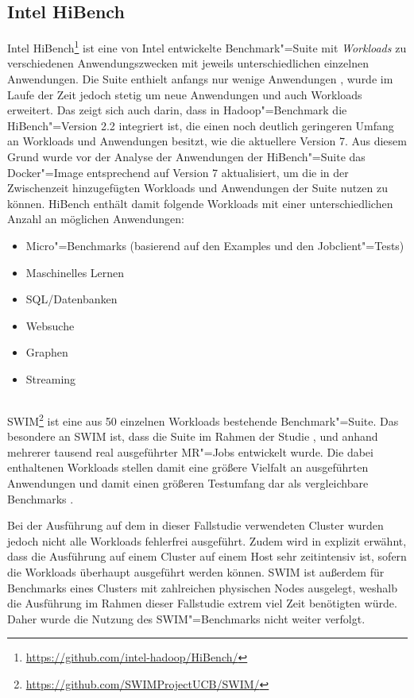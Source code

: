 \subsection{Intel HiBench}
\label{subsec:hibench}

Intel HiBench\footnote{\url{https://github.com/intel-hadoop/HiBench/}} ist eine von Intel entwickelte Benchmark"=Suite mit \emph{Workloads} zu verschiedenen Anwendungszwecken mit jeweils unterschiedlichen einzelnen Anwendungen.
Die Suite enthielt anfangs nur wenige Anwendungen \cite{Huang2010}, wurde im Laufe der Zeit jedoch stetig um neue Anwendungen und auch Workloads erweitert.
Das zeigt sich auch darin, dass in Hadoop"=Benchmark die HiBench"=Version \mbox{2.2} integriert ist, die einen noch deutlich geringeren Umfang an Workloads und Anwendungen besitzt, wie \zB die aktuellere Version 7.
Aus diesem Grund wurde vor der Analyse der Anwendungen der HiBench"=Suite das Docker"=Image entsprechend auf Version 7 aktualisiert, um die in der Zwischenzeit hinzugefügten Workloads und Anwendungen der Suite nutzen zu können.
HiBench enthält damit folgende Workloads mit einer unterschiedlichen Anzahl an möglichen Anwendungen:

\begin{itemize}
    \item Micro"=Benchmarks (basierend auf den Examples und den Jobclient"=Tests)
    \item Maschinelles Lernen
    \item SQL/Datenbanken
    \item Websuche
    \item Graphen
    \item Streaming
\end{itemize}

\subsection{}
\label{subsec:swim}

\gls{SWIM}\footnote{\url{https://github.com/SWIMProjectUCB/SWIM/}} ist eine aus 50 einzelnen Workloads bestehende Benchmark"=Suite.
Das besondere an \gls{SWIM} ist, dass die Suite im Rahmen der Studie \cite{Chen2012}, und anhand mehrerer tausend real ausgeführter \gls{MR}"=Jobs entwickelt wurde.
Die dabei enthaltenen Workloads stellen damit eine größere Vielfalt an ausgeführten Anwendungen und damit einen größeren Testumfang dar als vergleichbare Benchmarks \cite{SwimWikiHome}.

Bei der Ausführung auf dem in dieser Fallstudie verwendeten Cluster wurden jedoch nicht alle Workloads fehlerfrei ausgeführt.
Zudem wird in \cite{InriaTutorial} explizit erwähnt, dass die Ausführung auf einem Cluster auf einem Host sehr zeitintensiv ist, sofern die Workloads überhaupt ausgeführt werden können.
\gls{SWIM} ist außerdem für Benchmarks eines Clusters mit zahlreichen physischen Nodes ausgelegt, weshalb die Ausführung im Rahmen dieser Fallstudie extrem viel Zeit benötigten würde.
Daher wurde die Nutzung des \gls{SWIM}"=Benchmarks nicht weiter verfolgt.

